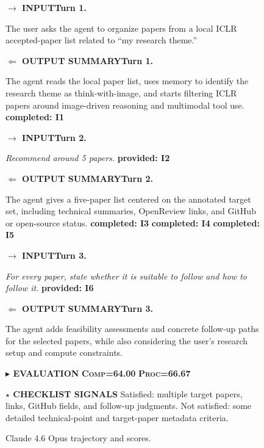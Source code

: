 \documentclass{llmxive}
\providecommand{\caseLeihaodiTwoTag}[3]{    {\setlength{\fboxsep}{1.6pt}\colorbox{#1}{\scriptsize\textbf{#3}}}}
\providecommand{\caseLeihaodiTwoLine}[3]{    \caseLeihaodiTwoTag{#1}{#2}{#3}\hspace{3pt}}
\providecommand{\caseLeihaodiTwoIO}[3]{    \vspace{2pt}
    \noindent\caseLeihaodiTwoLine{#1}{white}{#2}\textbf{#3}
}
\providecommand{\caseLeihaodiTwoBox}[2]{\begin{tcolorbox}[
    title=#1,
    colback=casebg,
    colframe=casetitlebg,
    rounded corners,
    sharp corners=northeast,
    sharp corners=southwest,
    width=1.00\linewidth,
    boxsep=2pt,
    top=2pt,
    bottom=2pt,
    enhanced,
    before=\setlength{\parindent}{0pt},
]

#2
\end{tcolorbox}
}
\begin{document}
\begin{figure}[!htbp]
    \centering
    \caseLeihaodiTwoBox{Case Study -- Researcher -- Claude 4.6 Opus: Trajectory and Scores}{
    \small
    \caseLeihaodiTwoIO{blue!65!black}{$\rightarrow$ INPUT}{Turn 1.}
    The user asks the agent to organize papers from a local ICLR accepted-paper list related to ``my research theme.''

    \caseLeihaodiTwoIO{green!45!black}{$\Leftarrow$ OUTPUT SUMMARY}{Turn 1.}
    The agent reads the local paper list, uses memory to identify the research theme as think-with-image, and starts filtering ICLR papers around image-driven reasoning and multimodal tool use.
    \caseLeihaodiTwoTag{green!12}{green!45!black}{completed: I1}

    \vspace{3pt}
    \caseLeihaodiTwoIO{blue!65!black}{$\rightarrow$ INPUT}{Turn 2.}
    \emph{Recommend around 5 papers.}
    \caseLeihaodiTwoTag{red!15}{red!70!black}{provided: I2}

    \caseLeihaodiTwoIO{green!45!black}{$\Leftarrow$ OUTPUT SUMMARY}{Turn 2.}
    The agent gives a five-paper list centered on the annotated target set, including technical summaries, OpenReview links, and GitHub or open-source status.
    \caseLeihaodiTwoTag{green!12}{green!45!black}{completed: I3}
    \hspace{2pt}\caseLeihaodiTwoTag{green!12}{green!45!black}{completed: I4}
    \hspace{2pt}\caseLeihaodiTwoTag{green!12}{green!45!black}{completed: I5}

    \vspace{3pt}
    \caseLeihaodiTwoIO{blue!65!black}{$\rightarrow$ INPUT}{Turn 3.}
    \emph{For every paper, state whether it is suitable to follow and how to follow it.}
    \caseLeihaodiTwoTag{red!15}{red!70!black}{provided: I6}

    \caseLeihaodiTwoIO{green!45!black}{$\Leftarrow$ OUTPUT SUMMARY}{Turn 3.}
    The agent adds feasibility assessments and concrete follow-up paths for the selected papers, while also considering the user's research setup and compute constraints.

    \vspace{3pt}
    \caseLeihaodiTwoLine{purple!70!black}{white}{$\blacktriangleright$ EVALUATION}
    \caseLeihaodiTwoTag{orange!15}{orange!80!black}{\textsc{Comp}=64.00}
    \hspace{3pt}
    \caseLeihaodiTwoTag{cyan!15}{cyan!45!black}{\textsc{Proc}=66.67}

    \vspace{2pt}
    \noindent\caseLeihaodiTwoLine{orange!80!black}{white}{$\star$ CHECKLIST SIGNALS}
    Satisfied: multiple target papers, links, GitHub fields, and follow-up judgments.
    Not satisfied: some detailed technical-point and target-paper metadata criteria.
    }
    \caption{Claude 4.6 Opus trajectory and scores.}
    \label{fig:case_leihaodi_2_claude_trajectory}
\end{figure}
\end{document}
